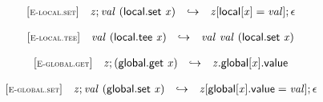 $$
\begin{array}{@{}l@{}lcl@{}l@{}}
{[\textsc{\scriptsize E{-}local.set}]} \quad & {\mathit{z}} ; {\mathit{val}}~(\mathsf{local.set}~{\mathit{x}}) &\hookrightarrow& {\mathit{z}}{}[\mathsf{local}{}[{\mathit{x}}] = {\mathit{val}}] ; \epsilon &  \\
\end{array}
$$

$$
\begin{array}{@{}l@{}lcl@{}l@{}}
{[\textsc{\scriptsize E{-}local.tee}]} \quad & {\mathit{val}}~(\mathsf{local.tee}~{\mathit{x}}) &\hookrightarrow& {\mathit{val}}~{\mathit{val}}~(\mathsf{local.set}~{\mathit{x}}) &  \\
\end{array}
$$

\vspace{1ex}

$$
\begin{array}{@{}l@{}lcl@{}l@{}}
{[\textsc{\scriptsize E{-}global.get}]} \quad & {\mathit{z}} ; (\mathsf{global.get}~{\mathit{x}}) &\hookrightarrow& {{\mathit{z}}.\mathsf{global}}{{}[{\mathit{x}}]}.\mathsf{value} &  \\
\end{array}
$$

$$
\begin{array}{@{}l@{}lcl@{}l@{}}
{[\textsc{\scriptsize E{-}global.set}]} \quad & {\mathit{z}} ; {\mathit{val}}~(\mathsf{global.set}~{\mathit{x}}) &\hookrightarrow& {\mathit{z}}{}[\mathsf{global}{}[{\mathit{x}}].\mathsf{value} = {\mathit{val}}] ; \epsilon &  \\
\end{array}
$$

\vspace{1ex}

